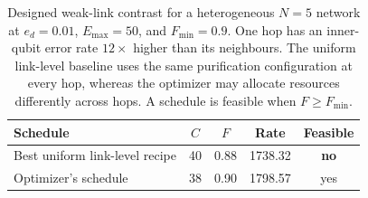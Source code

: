 \begin{table}[ht]
    \centering
    \small
    \begin{tabular}{lcccc}
        \hline
        Schedule & $C$ & $F$ & Rate & Feasible \\
        \hline
        Best uniform link-level recipe & 40 & 0.88 & 1738.32 & \textbf{no} \\
        Optimizer's schedule & 38 & 0.90 & 1798.57 & yes \\
        \hline
    \end{tabular}

    \caption[Designed weak-link contrast comparison]{Designed weak-link contrast for a heterogeneous $N=5$ network at $e_d=0.01$, $E_{\max}=50$, and $F_{\min}=0.9$. One hop has an inner-qubit error rate $12\times$ higher than its neighbours. The uniform link-level baseline uses the same purification configuration at every hop, whereas the optimizer may allocate resources differently across hops. A schedule is feasible when $F\ge F_{\min}$.}
    \label{tab:weaklink}
\end{table}